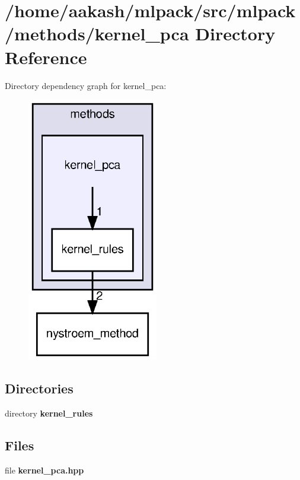 \section{/home/aakash/mlpack/src/mlpack/methods/kernel\+\_\+pca Directory Reference}
\label{dir_d5ae1c28f4bc41f3d043610e8096d80a}
Directory dependency graph for kernel\+\_\+pca\+:
\nopagebreak
\begin{figure}[H]
\begin{center}
\leavevmode
\includegraphics[width=162pt]{dir_d5ae1c28f4bc41f3d043610e8096d80a_dep}
\end{center}
\end{figure}
\subsection*{Directories}
\begin{DoxyCompactItemize}
\item 
directory \textbf{ kernel\+\_\+rules}
\end{DoxyCompactItemize}
\subsection*{Files}
\begin{DoxyCompactItemize}
\item 
file \textbf{ kernel\+\_\+pca.\+hpp}
\end{DoxyCompactItemize}
